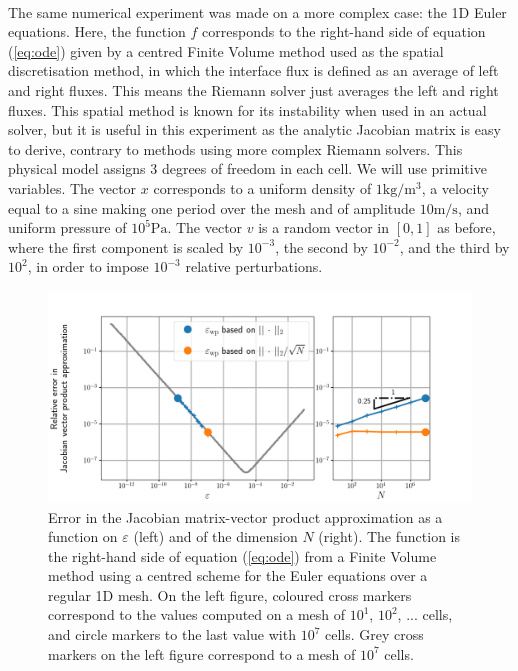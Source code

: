       \paragraph{}
      The same numerical experiment was made on a more complex case: the 1D Euler equations.
      Here, the function $f$ corresponds to the right-hand side of equation (\ref{eq:ode}) given by a centred Finite Volume method used as the spatial discretisation method, in which the interface flux is defined as an average of left and right fluxes.
      This means the Riemann solver just averages the left and right fluxes.
      This spatial method is known for its instability when used in an actual solver, but it is useful in this experiment as the analytic Jacobian matrix is easy to derive, contrary to methods using more complex Riemann solvers.
      This physical model assigns 3 degrees of freedom in each cell.
      We will use primitive variables.
      The vector $x$ corresponds to a uniform density of $1\si{\kilogram\per\cubic\meter}$, a velocity equal to a sine making one period over the mesh and of amplitude $10\si{\meter\per\second}$, and uniform pressure of $10^5\si{\pascal}$.
      The vector $v$ is a random vector in $\left[0, 1\right]$ as before, where the first component is scaled by $10^{-3}$, the second by $10^{-2}$, and the third by $10^{2}$, in order to impose $10^{-3}$ relative perturbations.

      \begin{figure}
        \centering
        \includegraphics[width=\textwidth]{figures/epsilon_Euler.png}
        \caption{
          Error in the Jacobian matrix-vector product approximation as a function on $\varepsilon$ (left) and of the dimension $N$ (right).
          The function is the right-hand side of equation (\ref{eq:ode}) from a Finite Volume method using a centred scheme for the Euler equations over a regular 1D mesh.
          On the left figure, coloured cross markers correspond to the values computed on a mesh of $10^1$, $10^2$, ... cells, and circle markers to the last value with $10^7$ cells.
          Grey cross markers on the left figure correspond to a mesh of $10^7$ cells.
        }
        \label{fig:epsilon_euler}
      \end{figure}

